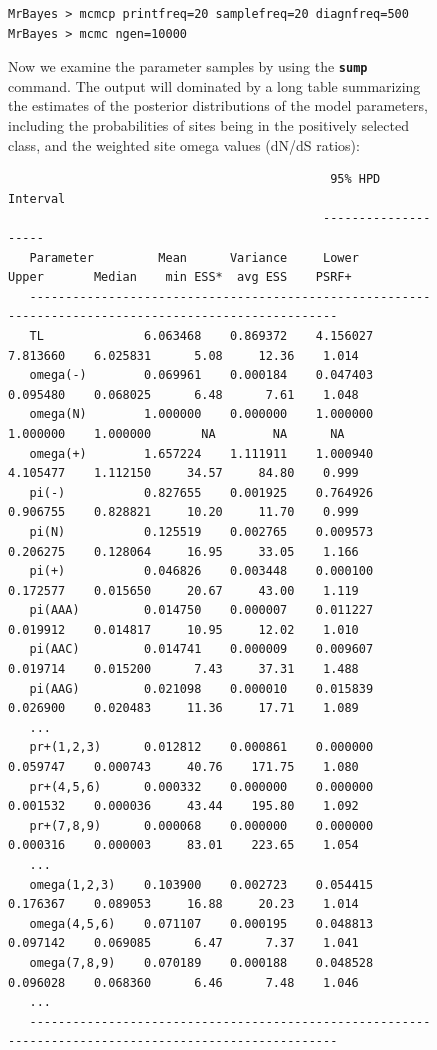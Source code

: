 \documentclass[12pt]{book}
\newcommand{\ttt}[1]{\texttt{#1}}
\newcommand{\tb}[1]{\ttt{\textbf{#1}}}
\begin{document}
\begin{figure}[h]
\begin{singlespacing}
\small
\begin{verbatim}
MrBayes > mcmcp printfreq=20 samplefreq=20 diagnfreq=500
MrBayes > mcmc ngen=10000
\end{verbatim}
\normalsize
\end{singlespacing}

Now we examine the parameter samples by using the \tb{sump} command. The output will dominated by a
long table summarizing the estimates of the posterior distributions of the model parameters,
including the probabilities of sites being in the positively selected class, and the weighted site
omega values (dN/dS ratios):


\begin{singlespacing}
\tiny
\begin{verbatim}
                                             95% HPD Interval
                                            --------------------
   Parameter         Mean      Variance     Lower       Upper       Median    min ESS*  avg ESS    PSRF+ 
   ------------------------------------------------------------------------------------------------------
   TL              6.063468    0.869372    4.156027    7.813660    6.025831      5.08     12.36    1.014
   omega(-)        0.069961    0.000184    0.047403    0.095480    0.068025      6.48      7.61    1.048
   omega(N)        1.000000    0.000000    1.000000    1.000000    1.000000       NA        NA      NA   
   omega(+)        1.657224    1.111911    1.000940    4.105477    1.112150     34.57     84.80    0.999
   pi(-)           0.827655    0.001925    0.764926    0.906755    0.828821     10.20     11.70    0.999
   pi(N)           0.125519    0.002765    0.009573    0.206275    0.128064     16.95     33.05    1.166
   pi(+)           0.046826    0.003448    0.000100    0.172577    0.015650     20.67     43.00    1.119
   pi(AAA)         0.014750    0.000007    0.011227    0.019912    0.014817     10.95     12.02    1.010
   pi(AAC)         0.014741    0.000009    0.009607    0.019714    0.015200      7.43     37.31    1.488
   pi(AAG)         0.021098    0.000010    0.015839    0.026900    0.020483     11.36     17.71    1.089
   ...
   pr+(1,2,3)      0.012812    0.000861    0.000000    0.059747    0.000743     40.76    171.75    1.080
   pr+(4,5,6)      0.000332    0.000000    0.000000    0.001532    0.000036     43.44    195.80    1.092
   pr+(7,8,9)      0.000068    0.000000    0.000000    0.000316    0.000003     83.01    223.65    1.054
   ...
   omega(1,2,3)    0.103900    0.002723    0.054415    0.176367    0.089053     16.88     20.23    1.014
   omega(4,5,6)    0.071107    0.000195    0.048813    0.097142    0.069085      6.47      7.37    1.041
   omega(7,8,9)    0.070189    0.000188    0.048528    0.096028    0.068360      6.46      7.48    1.046
   ...
   ------------------------------------------------------------------------------------------------------


\end{verbatim}
\end{singlespacing}
\end{figure}
\end{document}
